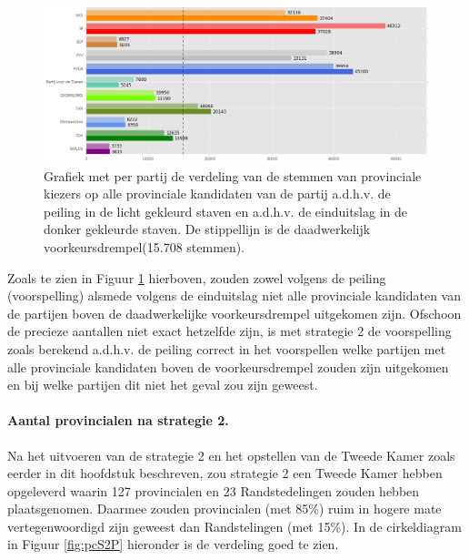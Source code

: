 \begin{figure}[H]

	\includegraphics[width=\linewidth]	{stemmen_op_provincialen_willekeurig_samen.png}

			\caption{Grafiek met per partij de verdeling van de stemmen van provinciale kiezers op alle provinciale kandidaten van de partij a.d.h.v. de peiling \citep{IPSOS} in de licht gekleurd staven en a.d.h.v. de einduitslag \citep{Kiesraad_databank} in de donker gekleurde staven. De stippellijn is de daadwerkelijk voorkeursdrempel(15.708 stemmen).}

\label{fig:stemmenS2P}
\end{figure}

Zoals te zien in Figuur \ref{fig:stemmenS2P} hierboven, zouden zowel volgens de peiling (voorspelling) alsmede volgens de einduitslag niet alle provinciale kandidaten van de partijen boven de daadwerkelijke voorkeursdrempel uitgekomen zijn. Ofschoon de precieze aantallen niet exact hetzelfde zijn, is met strategie 2 de voorspelling zoals berekend a.d.h.v. de peiling correct in het voorspellen welke partijen met alle provinciale kandidaten boven de voorkeursdrempel zouden zijn uitgekomen en bij welke partijen dit niet het geval zou zijn geweest. 

\paragraph{Aantal provincialen na strategie 2.}
Na het uitvoeren van de strategie 2 en het opstellen van de Tweede Kamer zoals eerder in dit hoofdstuk beschreven, zou strategie 2 een Tweede Kamer hebben opgeleverd waarin 127 provincialen en 23 Randstedelingen zouden hebben plaatsgenomen. Daarmee zouden provincialen (met 85\%) ruim in hogere mate vertegenwoordigd zijn geweest dan Randstelingen (met 15\%). In de cirkeldiagram in Figuur \ref{fig:pcS2P} hieronder is de verdeling goed te zien. 


